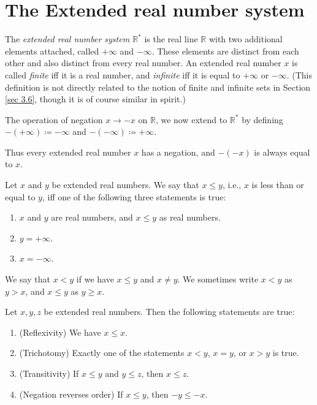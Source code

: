 \section{The Extended real number system}\label{sec 6.2}

\begin{definition}\label{6.2.1}
The \emph{extended real number system \(\mathds{R}^*\)} is the real line \(\mathds{R}\) with two additional elements attached, called \(+\infty\) and \(-\infty\).
These elements are distinct from each other and also distinct from every real number.
An extended real number \(x\) is called \emph{finite} iff it is a real number, and \emph{infinite} iff it is equal to \(+\infty\) or \(-\infty\).
(This definition is not directly related to the notion of finite and infinite sets in Section \ref{sec 3.6}, though it is of course similar in spirit.)
\end{definition}

\begin{definition}\label{6.2.2}
The operation of negation \(x \to -x\) on \(\mathds{R}\), we now extend to \(\mathds{R}^*\) by defining \(-(+\infty) \coloneqq -\infty\) and \(-(-\infty) \coloneqq +\infty\).
\end{definition}

\begin{note}
Thus every extended real number \(x\) has a negation, and \(-(-x)\) is always equal to \(x\).
\end{note}

\begin{definition}\label{6.2.3}
Let \(x\) and \(y\) be extended real numbers.
We say that \(x \leq y\), i.e., \(x\) is less than or equal to \(y\), iff one of the following three statements is true:
\begin{enumerate}
    \item \(x\) and \(y\) are real numbers, and \(x \leq y\) as real numbers.
    \item \(y = +\infty\).
    \item \(x = -\infty\).
\end{enumerate}
We say that \(x < y\) if we have \(x \leq y\) and \(x \neq y\).
We sometimes write \(x < y\) as \(y > x\), and \(x \leq y\) as \(y \geq x\).
\end{definition}

\setcounter{theorem}{4}
\begin{proposition}\label{6.2.5}
Let \(x, y, z\) be extended real numbers.
Then the following statements are true:
\begin{enumerate}
    \item (Reflexivity)
    We have \(x \leq x\).
    \item (Trichotomy)
    Exactly one of the statements \(x < y\), \(x = y\), or \(x > y\) is true.
    \item (Transitivity)
    If \(x \leq y\) and \(y \leq z\), then \(x \leq z\).
    \item (Negation reverses order) If \(x \leq y\), then \(-y \leq -x\).
\end{enumerate}
\end{proposition}

